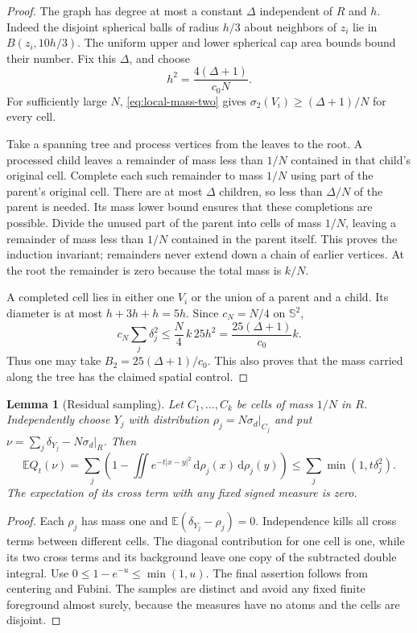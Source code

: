 \documentclass[11pt,a4paper]{article}
\newtheorem{lemma}[theorem]{Lemma}
\theoremstyle{definition}
\newcommand{\E}{\mathbb E}
\newcommand{\Sph}{\mathbb S}
\newcommand{\dd}{\,\mathrm d}
\newcommand{\abs}[1]{\lvert#1\rvert}
\numberwithin{equation}{section}
\begin{document}
\begin{proof}
The graph has degree at most a constant $\Delta$ independent of $R$ and $h$. Indeed the disjoint spherical balls of radius $h/3$ about neighbors of $z_i$ lie in $B(z_i,10h/3)$. The uniform upper and lower spherical cap area bounds bound their number. Fix this $\Delta$, and choose
\[
 h^2=\frac{4(\Delta+1)}{c_0N}.
\]
For sufficiently large $N$, \eqref{eq:local-mass-two} gives $\sigma_2(V_i)\ge(\Delta+1)/N$ for every cell.

Take a spanning tree and process vertices from the leaves to the root. A processed child leaves a remainder of mass less than $1/N$ contained in that child's original cell. Complete each such remainder to mass $1/N$ using part of the parent's original cell. There are at most $\Delta$ children, so less than $\Delta/N$ of the parent is needed. Its mass lower bound ensures that these completions are possible. Divide the unused part of the parent into cells of mass $1/N$, leaving a remainder of mass less than $1/N$ contained in the parent itself. This proves the induction invariant; remainders never extend down a chain of earlier vertices. At the root the remainder is zero because the total mass is $k/N$.

A completed cell lies in either one $V_i$ or the union of a parent and a child. Its diameter is at most $h+3h+h=5h$. Since $c_N=N/4$ on $\Sph^2$,
\[
 c_N\sum_j\delta_j^2\le\frac N4\,k\,25h^2
       =\frac{25(\Delta+1)}{c_0}k.
\]
Thus one may take $B_2=25(\Delta+1)/c_0$. This also proves that the mass carried along the tree has the claimed spatial control.
\end{proof}

\begin{lemma}[Residual sampling]\label{lem:cells}
Let $C_1,\ldots,C_k$ be cells of mass $1/N$ in $R$. Independently choose $Y_j$ with distribution $\rho_j=N\sigma_d|_{C_j}$ and put $\nu=\sum_j\delta_{Y_j}-N\sigma_d|_R$. Then
\begin{equation}\label{eq:cellcost}
 \E Q_t(\nu)=\sum_j\left(1-\iint e^{-t\abs{x-y}^2}\dd\rho_j(x)\dd\rho_j(y)\right)
       \le\sum_j\min(1,t\delta_j^2).
\end{equation}
The expectation of its cross term with any fixed signed measure is zero.
\end{lemma}
\begin{proof}
Each $\rho_j$ has mass one and $\E(\delta_{Y_j}-\rho_j)=0$. Independence kills all cross terms between different cells. The diagonal contribution for one cell is one, while its two cross terms and its background leave one copy of the subtracted double integral. Use $0\le1-e^{-u}\le\min(1,u)$. The final assertion follows from centering and Fubini. The samples are distinct and avoid any fixed finite foreground almost surely, because the measures have no atoms and the cells are disjoint.
\end{proof}
\end{document}
